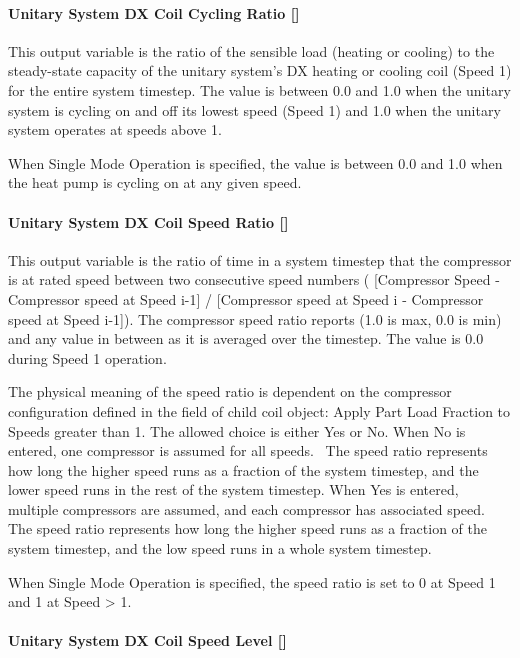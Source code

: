\paragraph{Unitary System DX Coil Cycling Ratio {[]}}\label{unitary-system-dx-coil-cycling-ratio}

This output variable is the ratio of the sensible load (heating or cooling) to the steady-state capacity of the unitary system's DX heating or cooling coil (Speed 1) for the entire system timestep. The value is between 0.0 and 1.0 when the unitary system is cycling on and off its lowest speed (Speed 1) and 1.0 when the unitary system operates at speeds above 1.

When Single Mode Operation is specified, the value is between 0.0 and 1.0 when the heat pump is cycling on at any given speed.

\paragraph{Unitary System DX Coil Speed Ratio {[]}}\label{unitary-system-dx-coil-speed-ratio}

This output variable is the ratio of time in a system timestep that the compressor is at rated speed between two consecutive speed numbers ( {[}Compressor Speed - Compressor speed at Speed i-1{]} / {[}Compressor speed at Speed i - Compressor speed at Speed i-1{]}). The compressor speed ratio reports (1.0 is max, 0.0 is min) and any value in between as it is averaged over the timestep. The value is 0.0 during Speed 1 operation.

The physical meaning of the speed ratio is dependent on the compressor configuration defined in the field of child coil object: Apply Part Load Fraction to Speeds greater than 1. The allowed choice is either Yes or No. When No is entered, one compressor is assumed for all speeds. ~The speed ratio represents how long the higher speed runs as a fraction of the system timestep, and the lower speed runs in the rest of the system timestep. When Yes is entered, multiple compressors are assumed, and each compressor has associated speed. The speed ratio represents how long the higher speed runs as a fraction of the system timestep, and the low speed runs in a whole system timestep.

When Single Mode Operation is specified, the speed ratio is set to 0 at Speed 1 and 1 at Speed \textgreater{} 1.

\paragraph{Unitary System DX Coil Speed Level {[]}}\label{unitary-system-dx-coil-speed-level}

